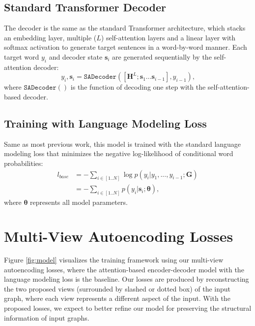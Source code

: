 \documentclass[11pt,a4paper]{article}
\begin{document}
\subsection{Standard Transformer Decoder}


The decoder is the same as the standard Transformer architecture, which stacks an embedding layer, multiple ($L$) self-attention layers and a linear layer with softmax activation to generate target sentences in a word-by-word manner.
Each target word $y_i$ and decoder state $\boldsymbol{s}_i$ are generated sequentially by the self-attention decoder:
\begin{equation} \label{eq:target_decoder}
    y_i, \boldsymbol{s}_i = \mathtt{SADecoder}([\boldsymbol{H}^{L};\boldsymbol{s}_1...\boldsymbol{s}_{i-1}], y_{i-1}) \text{,}
\end{equation}
where $\mathtt{SADecoder()}$ is the function of decoding one step with the self-attention-based decoder.


\subsection{Training with Language Modeling Loss}


Same as most previous work, this model is trained with the standard language modeling loss that minimizes the negative log-likelihood of conditional word probabilities:
\begin{equation} \label{eq:lm_loss}
\begin{split}
    l_{base} &= -\sum_{i\in[1..N]} \log p(y_i|y_1,...,y_{i-1};\boldsymbol{G}) \\
    &= -\sum_{i\in[1..N]} p(y_i|\boldsymbol{s}_i;\boldsymbol{\theta}) \text{,}
\end{split}
\end{equation}
where $\boldsymbol{\theta}$ represents all model parameters.


\section{Multi-View Autoencoding Losses}


Figure \ref{fig:model} visualizes the training framework using our multi-view autoencoding losses, where the attention-based encoder-decoder model with the language modeling loss is the baseline.
Our losses are produced by reconstructing the two proposed views (surrounded by slashed or dotted box) of the input graph, where each view represents a different aspect of the input.
With the proposed losses, we expect to better refine our model for preserving the structural information of input graphs.
\end{document}
